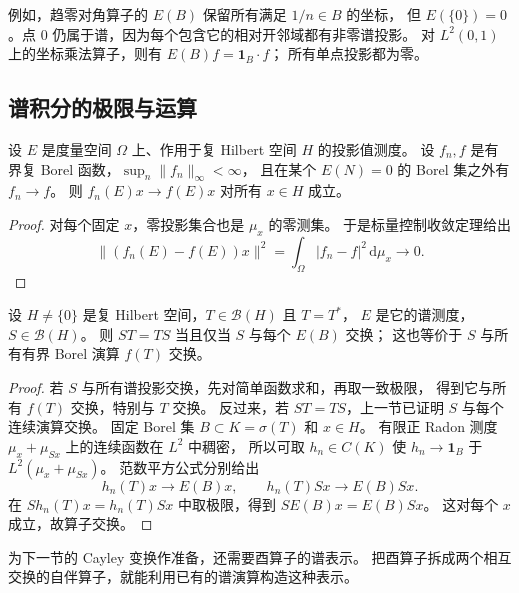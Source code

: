 例如，趋零对角算子的 \(E(B)\) 保留所有满足 \(1/n\in B\) 的坐标，
但 \(E(\{0\})=0\)。点 \(0\) 仍属于谱，因为每个包含它的相对开邻域都有非零谱投影。
对 \(L^2(0,1)\) 上的坐标乘法算子，则有 \(E(B)f=\mathbf1_B\cdot f\)；
所有单点投影都为零。

\subsection{谱积分的极限与运算}
\label{b1:subsec:290404}

\begin{proposition}[有界逐点收敛与谱演算]
\label{b1:prop:29-borel-dominated}
设 \(E\) 是度量空间 \(\Omega\) 上、作用于复 Hilbert 空间 \(H\) 的投影值测度。
设 \(f_n,f\) 是有界复 Borel 函数，\(\sup_n\|f_n\|_\infty<\infty\)，
且在某个 \(E(N)=0\) 的 Borel 集之外有 \(f_n\to f\)。
则 \(f_n(E)x\to f(E)x\) 对所有 \(x\in H\) 成立。
\end{proposition}
\begin{proof}
对每个固定 \(x\)，零投影集合也是 \(\mu_x\) 的零测集。
于是标量控制收敛定理给出
\[
 \|(f_n(E)-f(E))x\|^2
 =\int_\Omega|f_n-f|^2\,\mathrm{d}\mu_x\longrightarrow0.
\]
\end{proof}

\begin{proposition}[与谱投影交换的判别]
\label{b1:prop:29-spectral-commutation}
设 \(H\ne\{0\}\) 是复 Hilbert 空间，\(T\in\mathcal B(H)\) 且 \(T=T^*\)，
\(E\) 是它的谱测度，\(S\in\mathcal B(H)\)。
则 \(ST=TS\) 当且仅当 \(S\) 与每个 \(E(B)\) 交换；
这也等价于 \(S\) 与所有有界 Borel 演算 \(f(T)\) 交换。
\end{proposition}
\begin{proof}
若 \(S\) 与所有谱投影交换，先对简单函数求和，再取一致极限，
得到它与所有 \(f(T)\) 交换，特别与 \(T\) 交换。
反过来，若 \(ST=TS\)，上一节已证明 \(S\) 与每个连续演算交换。
固定 Borel 集 \(B\subset K=\sigma(T)\) 和 \(x\in H\)。
有限正 Radon 测度 \(\mu_x+\mu_{Sx}\) 上的连续函数在 \(L^2\) 中稠密，
所以可取 \(h_n\in C(K)\) 使
\(h_n\to\mathbf1_B\) 于 \(L^2(\mu_x+\mu_{Sx})\)。
范数平方公式分别给出
\[
 h_n(T)x\to E(B)x,\qquad h_n(T)Sx\to E(B)Sx.
\]
在 \(S h_n(T)x=h_n(T)Sx\) 中取极限，得到 \(SE(B)x=E(B)Sx\)。
这对每个 \(x\) 成立，故算子交换。
\end{proof}

为下一节的 Cayley 变换作准备，还需要酉算子的谱表示。
把酉算子拆成两个相互交换的自伴算子，就能利用已有的谱演算构造这种表示。

